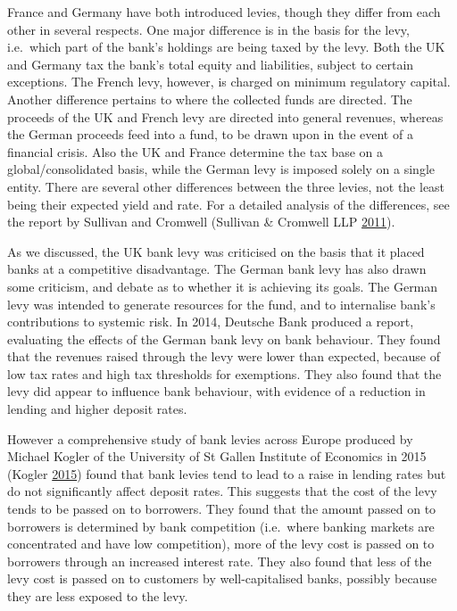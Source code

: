 \documentclass[]{tufte-handout}
\begin{document}
France and Germany have both introduced levies, though they differ from
each other in several respects. One major difference is in the basis for
the levy, i.e.~which part of the bank's holdings are being taxed by the
levy. Both the UK and Germany tax the bank's total equity and
liabilities, subject to certain exceptions. The French levy, however, is
charged on minimum regulatory capital. Another difference pertains to
where the collected funds are directed. The proceeds of the UK and
French levy are directed into general revenues, whereas the German
proceeds feed into a fund, to be drawn upon in the event of a financial
crisis. Also the UK and France determine the tax base on a
global/consolidated basis, while the German levy is imposed solely on a
single entity. There are several other differences between the three
levies, not the least being their expected yield and rate. For a
detailed analysis of the differences, see the report by Sullivan and
Cromwell (Sullivan \& Cromwell LLP
\protect\hyperlink{ref-SullivanCromwellLLP2011}{2011}).

As we discussed, the UK bank levy was criticised on the basis that it
placed banks at a competitive disadvantage. The German bank levy has
also drawn some criticism, and debate as to whether it is achieving its
goals. The German levy was intended to generate resources for the fund,
and to internalise bank's contributions to systemic risk. In 2014,
Deutsche Bank produced a report, evaluating the effects of the German
bank levy on bank behaviour. They found that the revenues raised through
the levy were lower than expected, because of low tax rates and high tax
thresholds for exemptions. They also found that the levy did appear to
influence bank behaviour, with evidence of a reduction in lending and
higher deposit rates.

However a comprehensive study of bank levies across Europe produced by
Michael Kogler of the University of St Gallen Institute of Economics in
2015 (Kogler \protect\hyperlink{ref-Kogler2015}{2015}) found that bank
levies tend to lead to a raise in lending rates but do not significantly
affect deposit rates. This suggests that the cost of the levy tends to
be passed on to borrowers. They found that the amount passed on to
borrowers is determined by bank competition (i.e.~where banking markets
are concentrated and have low competition), more of the levy cost is
passed on to borrowers through an increased interest rate. They also
found that less of the levy cost is passed on to customers by
well-capitalised banks, possibly because they are less exposed to the
levy.
\end{document}
